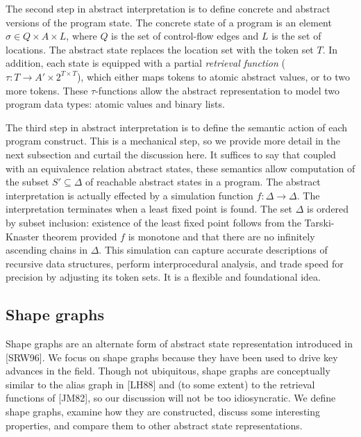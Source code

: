 \documentclass{article}
\begin{document}
The second step in abstract interpretation is to define concrete and
abstract versions of the program state.  The concrete state of a program is
an element $\sigma \in Q \times A \times L$, where $Q$ is the set of
control-flow edges and $L$ is the set of locations. The abstract state
replaces the location set with the token set $T$. In addition, each state is
equipped with a partial \textit{retrieval function} ($\tau : T \rightarrow
A' \times 2^{T \times T}$), which either maps tokens to atomic abstract
values, or to two more tokens. These $\tau$-functions allow the abstract
representation to model two program data types: atomic values and binary
lists.

The third step in abstract interpretation is to define the semantic action
of each program construct. This is a mechanical step, so we provide more
detail in the next subsection and curtail the discussion here. It suffices
to say that coupled with an equivalence relation abstract states, these
semantics allow computation of the subset $S' \subseteq \Delta$ of reachable
abstract states in a program. The abstract interpretation is actually
effected by a simulation function $f : \Delta \rightarrow \Delta$. The
interpretation terminates when a least fixed point is found. The set
$\Delta$ is ordered by subset inclusion: existence of the least fixed point
follows from the Tarski-Knaster theorem provided $f$ is monotone and that
there are no infinitely ascending chains in $\Delta$. This simulation can
capture accurate descriptions of recursive data structures, perform
interprocedural analysis, and trade speed for precision by adjusting its
token sets. It is a flexible and foundational idea.

\subsection{Shape graphs}

Shape graphs are an alternate form of abstract state representation
introduced in [SRW96]. We focus on shape graphs because they have been used
to drive key advances in the field. Though not ubiquitous, shape graphs are
conceptually similar to the alias graph in [LH88] and (to some extent) to
the retrieval functions of [JM82], so our discussion will not be too
idiosyncratic. We define shape graphs, examine how they are constructed,
discuss some interesting properties, and compare them to other abstract
state representations.
\end{document}
